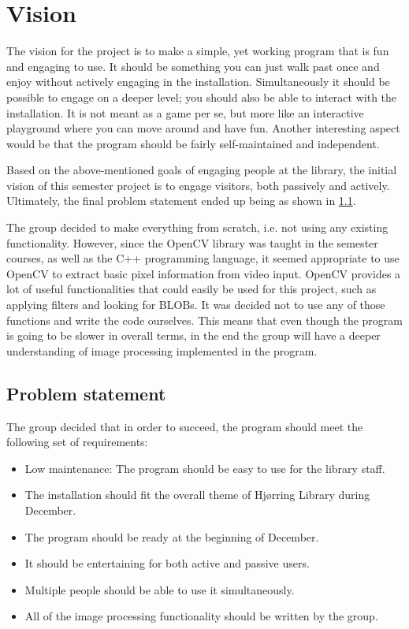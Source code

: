 \section{Vision}
The vision for the project is to make a simple, yet working program that is fun and engaging to use. It should be something you can just walk past once and enjoy without actively engaging in the installation. Simultaneously it should be possible to engage on a deeper level; you should also be able to interact with the installation. It is not meant as a game per se, but more like an interactive playground where you can move around and have fun. Another interesting aspect would be that the program should be fairly self-maintained and independent.

Based on the above-mentioned goals of engaging people at the library, the initial vision of this semester project is to engage visitors, both passively and actively. Ultimately, the final problem statement ended up being as shown in \ref{problemStatement}.

The group decided to make everything from scratch, i.e. not using any existing functionality. However, since the OpenCV library was taught in the semester courses, as well as the C++ programming language, it seemed appropriate to use OpenCV to extract basic pixel information from video input. OpenCV provides a lot of useful functionalities that could easily be used for this project, such as applying filters and looking for BLOBs. It was decided not to use any of those functions and write the code ourselves. This means that even though the program is going to be slower in overall terms, in the end the group will have a deeper understanding of image processing implemented in the program.

\subsection{Problem statement}\label{problemStatement}
The group decided that in order to succeed, the program should meet the following set of requirements:

\begin{itemize}
\item Low maintenance: The program should be easy to use for the library staff.
\item The installation should fit the overall theme of Hj{\o}rring Library during December.
\item The program should be ready at the beginning of December.
\item It should be entertaining for both active and passive users.
\item Multiple people should be able to use it simultaneously.
\item All of the image processing functionality should be written by the group.
\end{itemize}